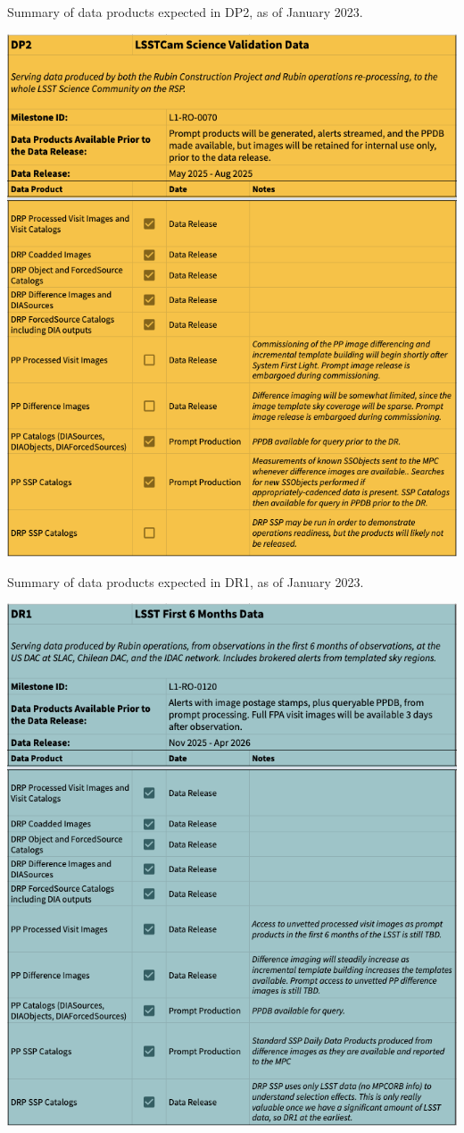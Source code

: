 \begin{table}[ht]
\centering
\label{tab:dp-two-products}
\caption{Summary of data products expected in DP2, as of January 2023.}
\includegraphics[width=0.9\linewidth]{figures/DP2-products}
\end{table}

\begin{table}[ht]
\centering
\caption{Summary of data products expected in DR1, as of January 2023.}
\label{tab:dr-one-products}
\includegraphics[width=0.9\linewidth]{figures/DR1-products}
\end{table}

\clearpage
